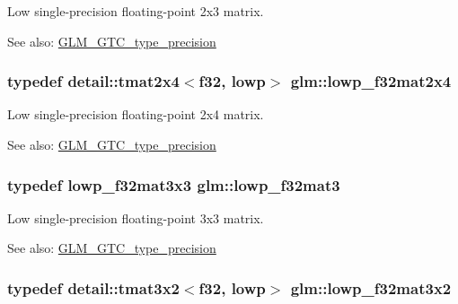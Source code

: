 Low single-precision floating-point 2x3 matrix. \begin{Desc}
\item[See also:]\hyperlink{group__gtc__type__precision}{GLM\_\-GTC\_\-type\_\-precision} \end{Desc}
\hypertarget{group__gtc__type__precision_ge0da8e4239df703d44875b49a900c893}{
\subsubsection[lowp\_\-f32mat2x4]{\setlength{\rightskip}{0pt plus 5cm}typedef detail::tmat2x4$<$f32, lowp$>$ {\bf glm::lowp\_\-f32mat2x4}}}
\label{group__gtc__type__precision_ge0da8e4239df703d44875b49a900c893}


Low single-precision floating-point 2x4 matrix. \begin{Desc}
\item[See also:]\hyperlink{group__gtc__type__precision}{GLM\_\-GTC\_\-type\_\-precision} \end{Desc}
\hypertarget{group__gtc__type__precision_g84500ab23c0f0f3c585f8ad02f33b88c}{
\subsubsection[lowp\_\-f32mat3]{\setlength{\rightskip}{0pt plus 5cm}typedef lowp\_\-f32mat3x3 {\bf glm::lowp\_\-f32mat3}}}
\label{group__gtc__type__precision_g84500ab23c0f0f3c585f8ad02f33b88c}


Low single-precision floating-point 3x3 matrix. \begin{Desc}
\item[See also:]\hyperlink{group__gtc__type__precision}{GLM\_\-GTC\_\-type\_\-precision} \end{Desc}
\hypertarget{group__gtc__type__precision_gdf8ee4630e8d2b6ae72293a7c8dff497}{
\subsubsection[lowp\_\-f32mat3x2]{\setlength{\rightskip}{0pt plus 5cm}typedef detail::tmat3x2$<$f32, lowp$>$ {\bf glm::lowp\_\-f32mat3x2}}}
\label{group__gtc__type__precision_gdf8ee4630e8d2b6ae72293a7c8dff497}


